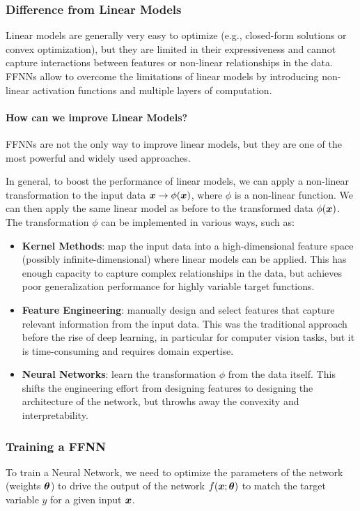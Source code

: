 \subsubsection{Difference from Linear Models}
Linear models are generally very easy to optimize (e.g., closed-form solutions or convex optimization), but they are limited in their expressiveness and cannot capture interactions between features or non-linear relationships in the data.
FFNNs allow to overcome the limitations of linear models by introducing non-linear activation functions and multiple layers of computation.

\paragraph{How can we improve Linear Models?}
FFNNs are not the only way to improve linear models, but they are one of the most powerful and widely used approaches.

In general, to boost the performance of linear models, we can apply a non-linear transformation to the input data 
$\boldsymbol{x} \rightarrow \phi(\boldsymbol{x})$, where $\phi$ is a non-linear function.
We can then apply the same linear model as before to the transformed data $\phi(\boldsymbol{x})$. 
The transformation $\phi$ can be implemented in various ways, such as:
\begin{itemize}
    \item \textbf{Kernel Methods}: map the input data into a high-dimensional feature space (possibly infinite-dimensional) where linear models can be applied.
    This has enough capacity to capture complex relationships in the data, but achieves poor generalization performance for highly variable target functions.
    \item \textbf{Feature Engineering}: manually design and select features that capture relevant information from the input data.
    This was the traditional approach before the rise of deep learning, in particular for computer vision tasks, but it is time-consuming and requires domain expertise.
    \item \textbf{Neural Networks}: learn the transformation $\phi$ from the data itself. 
    This shifts the engineering effort from designing features to designing the architecture of the network, but throwhs away the convexity and interpretability. 
\end{itemize}

\subsubsection{Training a FFNN}
To train a Neural Network, we need to optimize the parameters of the network (weights $\boldsymbol{\theta}$) to drive the output of the network $f(\boldsymbol{x}; \boldsymbol{\theta})$
to match the target variable $y$ for a given input $\boldsymbol{x}$.

